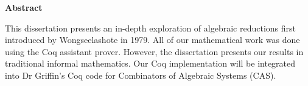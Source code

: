 \newpage
{\Huge \bf Abstract}
\vspace{24pt} 

%
%

This dissertation presents an in-depth exploration of algebraic reductions first introduced by Wongseelashote in 1979. All of our mathematical work was done using the Coq assistant prover. However, the dissertation presents our results in traditional informal mathematics. Our Coq implementation will be integrated into Dr Griffin's Coq code for Combinators of Algebraic Systems (CAS).

\newpage
\vspace*{\fill}
